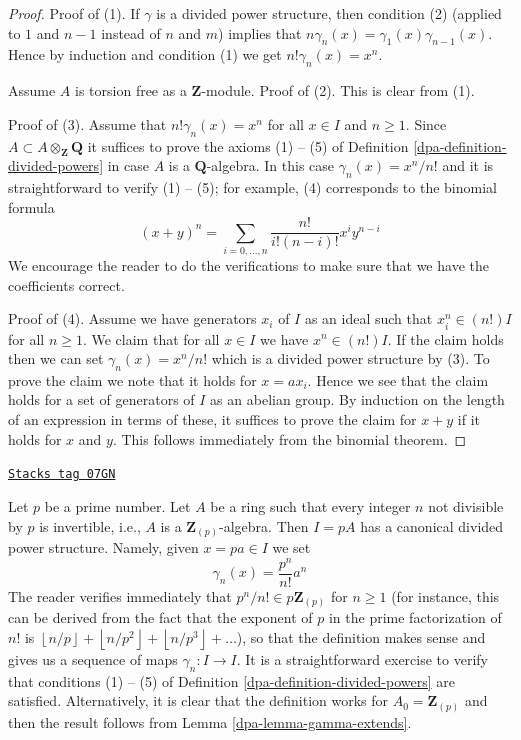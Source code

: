\begin{proof}

Proof of (1). If $\gamma$ is a divided power structure, then condition
(2) (applied to $1$ and $n-1$ instead of $n$ and $m$)
implies that $n \gamma_n(x) = \gamma_1(x)\gamma_{n - 1}(x)$. Hence
by induction and condition (1) we get $n! \gamma_n(x) = x^n$.

\medskip\noindent
Assume $A$ is torsion free as a $\mathbf{Z}$-module.
Proof of (2). This is clear from (1).

\medskip\noindent
Proof of (3). Assume that $n! \gamma_n(x) = x^n$ for all $x \in I$ and
$n \geq 1$. Since $A \subset A \otimes_{\mathbf{Z}} \mathbf{Q}$ it suffices
to prove the axioms (1) -- (5) of Definition
\ref{dpa-definition-divided-powers} in case $A$ is a $\mathbf{Q}$-algebra.
In this case $\gamma_n(x) = x^n/n!$ and it is straightforward
to verify (1) -- (5); for example, (4) corresponds to the binomial
formula
$$
(x + y)^n = \sum_{i = 0, \ldots, n} \frac{n!}{i!(n - i)!} x^iy^{n - i}
$$
We encourage the reader to do the verifications
to make sure that we have the coefficients correct.

\medskip\noindent
Proof of (4). Assume we have generators $x_i$ of $I$ as an ideal
such that $x_i^n \in (n!)I$ for all $n \geq 1$. We claim that
for all $x \in I$ we have $x^n \in (n!)I$. If the claim holds then
we can set $\gamma_n(x) = x^n/n!$ which is a divided power structure by (3).
To prove the claim we note that it holds for $x = ax_i$. Hence we see
that the claim holds for a set of generators of $I$ as an abelian group.
By induction on the length of an expression in terms of these, it suffices
to prove the claim for $x + y$ if it holds for $x$ and $y$. This
follows immediately from the binomial theorem.
\end{proof}

\begin{example}
\label{dpa-example-ideal-generated-by-p}
\href{https://stacks.math.columbia.edu/tag/07GN}{\texttt{Stacks tag 07GN}}

Let $p$ be a prime number.
Let $A$ be a ring such that every integer $n$ not divisible by $p$
is invertible, i.e., $A$ is a $\mathbf{Z}_{(p)}$-algebra. Then
$I = pA$ has a canonical divided power structure. Namely, given
$x = pa \in I$ we set
$$
\gamma_n(x) = \frac{p^n}{n!} a^n
$$
The reader verifies immediately that $p^n/n! \in p\mathbf{Z}_{(p)}$
for $n \geq 1$ (for instance, this can be derived from the fact
that the exponent of $p$ in the prime factorization of $n!$ is
$\left\lfloor n/p \right\rfloor + \left\lfloor n/p^2 \right\rfloor
+ \left\lfloor n/p^3 \right\rfloor + \ldots$),
so that the definition makes sense and gives us a sequence of
maps $\gamma_n : I \to I$. It is a straightforward exercise to
verify that conditions (1) -- (5) of
Definition \ref{dpa-definition-divided-powers} are satisfied.
Alternatively, it is clear that the definition works for
$A_0 = \mathbf{Z}_{(p)}$ and then the result follows from
Lemma \ref{dpa-lemma-gamma-extends}.
\end{example}

